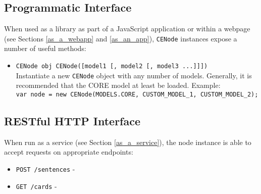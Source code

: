 \documentclass{article}
\begin{document}
\subsection{Programmatic Interface}
When used as a library as part of a JavaScript application or within a webpage (see Sections \ref{as_a_webapp} and \ref{as_an_app}), \texttt{CENode} instances expose a number of useful methods:

\begin{itemize}
    \item \texttt{CENode obj CENode([model1 [, model2 [, model3 ...]]])}\\
            Instantiate a new \texttt{CENode} object with any number of models. Generally, it is recommended that the CORE model at least be loaded. Example:\\
            \texttt{var node = new CENode(MODELS.CORE, CUSTOM\_MODEL\_1, CUSTOM\_MODEL\_2);}
        
\end{itemize}


\subsection{RESTful HTTP Interface}
When run as a service (see Section \ref{as_a_service}), the node instance is able to accept requests on appropriate endpoints:

\begin{itemize}
    \item \texttt{POST /sentences} - 
    \item \texttt{GET /cards} - 
\end{itemize}
\end{document}

